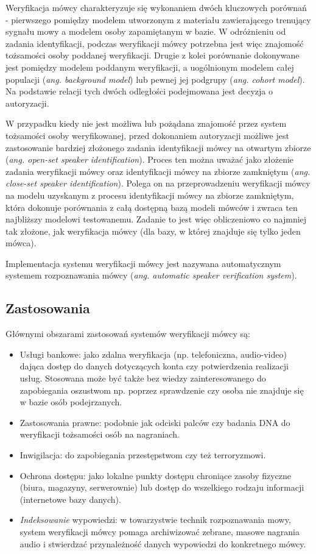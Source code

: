 Weryfikacja mówcy charakteryzuje się wykonaniem dwóch kluczowych porównań - pierwszego pomiędzy modelem utworzonym z materiału zawierającego trenujący sygnału mowy a modelem osoby zapamiętanym w bazie. W odróżnieniu od zadania identyfikacji, podczas weryfikacji mówcy potrzebna jest więc znajomość tożsamości osoby poddanej weryfikacji.
Drugie z kolei porównanie dokonywane jest pomiędzy modelem poddanym weryfikacji, a uogólnionym modelem całej populacji (\textit{ang. background model}) lub pewnej jej podgrupy (\textit{ang. cohort model}). Na podstawie relacji tych dwóch odległości podejmowana jest decyzja o autoryzacji.

W przypadku kiedy nie jest możliwa lub pożądana znajomość przez system tożsamości osoby weryfikowanej, przed dokonaniem autoryzacji możliwe jest zastosowanie bardziej złożonego zadania identyfikacji mówcy na otwartym zbiorze (\textit{ang. open-set speaker identification}). Proces ten można uważać jako złożenie zadania weryfikacji mówcy oraz identyfikacji mówcy na zbiorze zamkniętym (\textit{ang. close-set speaker identification}). Polega on na przeprowadzeniu weryfikacji mówcy na modelu
uzyskanym z procesu identyfikacji mówcy na zbiorze zamkniętym, która dokonuje porównania z całą dostępną bazą modeli mówców i zwraca ten najbliższy modelowi testowanemu. Zadanie to jest więc obliczeniowo co najmniej tak złożone, jak weryfikacja mówcy (dla bazy, w której znajduje się tylko jeden mówca).

Implementacja systemu weryfikacji mówcy jest nazywana automatycznym systemem rozpoznawania mówcy (\textit{ang. automatic speaker verification system}).

\subsection{Zastosowania}
Głównymi obszarami zastosowań systemów weryfikacji mówcy są:
\begin{itemize}
  \item Usługi bankowe: jako zdalna weryfikacja (np. telefoniczna, audio-video) dająca dostęp do danych dotyczących konta czy potwierdzenia realizacji usług. Stosowana może być także bez wiedzy zainteresowanego do zapobiegania oszustwom np. poprzez sprawdzenie czy osoba nie znajduje się w bazie osób podejrzanych.
  \item Zastosowania prawne: podobnie jak odciski palców czy badania DNA do weryfikacji tożsamości osób na nagraniach.
  \item Inwigilacja: do zapobiegania przestępstwom czy też terroryzmowi.
  \item Ochrona dostępu: jako lokalne punkty dostępu chroniące zasoby fizyczne (biura, magazyny, serwerownie) lub dostęp do wszelkiego rodzaju informacji (internetowe bazy danych).
  \item \textit{Indeksowanie} wypowiedzi: w towarzystwie technik rozpoznawania mowy, system weryfikacji mówcy pomaga archiwizować zebrane, masowe nagrania audio i stwierdzać przynależność danych wypowiedzi do konkretnego mówcy.
\end{itemize}

